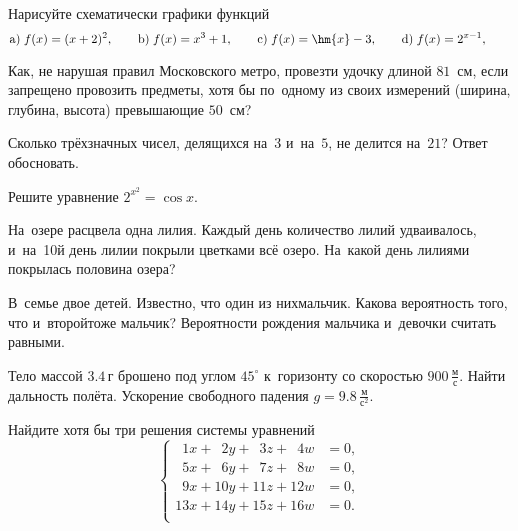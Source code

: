 \documentclass[draft]{article}
\begin{document}
\begin{problem}
Нарисуйте схематически графики функций
$$
\po{a} f(x)=(x+2)^2,\qquad
\po{b} f(x)=x^3+1,\qquad
\po{c} f(x)=\hm{x}-3,\qquad
\po{d} f(x)=2^{x-1},\qquad
$$
\end{problem}

\begin{problem}
Как, не нарушая правил Московского метро, провезти удочку длиной $81$~см,
если запрещено провозить предметы, хотя бы по~одному из своих измерений (ширина, глубина, высота)
превышающие $50$~см?
\end{problem}

\begin{problem}
Сколько трёхзначных чисел, делящихся на~$3$ и~на~$5$, не делится на~$21$? Ответ обосновать.
\end{problem}

\begin{problem}
Решите уравнение $2^{x^2} = \cos x$.
\end{problem}

\begin{problem}
На~озере расцвела одна лилия. Каждый день количество лилий удваивалось,
и~на~10\д й день лилии покрыли цветками всё озеро. На~какой день лилиями
покрылась половина озера?
\end{problem}

\begin{problem}
В~семье двое детей. Известно, что один из них\т мальчик. Какова вероятность того, что
и~второй\т тоже мальчик? Вероятности рождения мальчика и~девочки считать равными.
\end{problem}

\begin{problem}
Тело массой $3.4$\,г брошено под углом $45^\circ$ к~горизонту со скоростью $900$\,$\frac{\mbox{м}}{\mbox{с}}$.
Найти дальность полёта. Ускорение свободного падения $g=9.8$\,$\frac{\mbox{м}}{\mbox{с}^2}$.
\end{problem}

\def\pz{\phantom{0}}

\begin{problem}
Найдите хотя бы три решения системы уравнений
$$\left\{\begin{aligned}
\pz1x+ \pz2y + \pz3z + \pz4w &=0,\\
\pz5x+ \pz6y + \pz7z + \pz8w &=0,\\
\pz9x+10y +11z + 12w &=0,\\
13x+14y +15z + 16w &=0.\\
\end{aligned}\right.$$
\end{problem}
\end{document}
